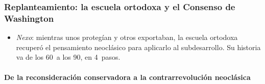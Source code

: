 \documentclass[11pt]{article}
\begin{document}
\subsubsection{Replanteamiento: la escuela ortodoxa y el Consenso de Washington}\label{sec:ortodoxa}

\begin{itemize}
\item \emph{Nexo}: mientras unos protegían y otros exportaban, la escuela ortodoxa recuperó el pensamiento neoclásico para aplicarlo al subdesarrollo. Su historia va de los 60~a los 90, en 4~pasos.
\end{itemize}

\paragraph{De la reconsideración conservadora a la contrarrevolución neoclásica}
\end{document}
